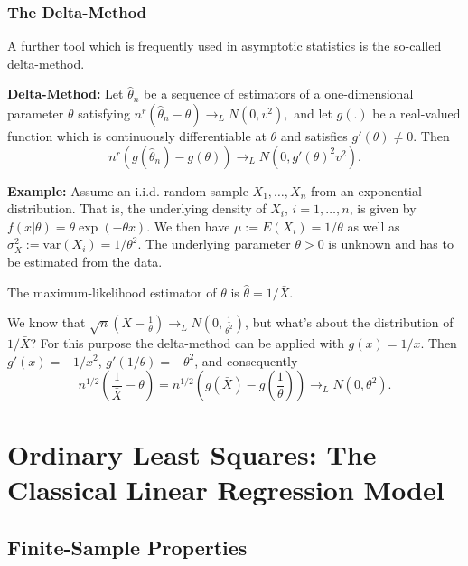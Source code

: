 \documentclass[]{book}
\theoremstyle{definition}
\theoremstyle{definition}
\theoremstyle{definition}
\theoremstyle{remark}
\begin{document}
\hypertarget{the-delta-method}{%
\subsection{The Delta-Method}\label{the-delta-method}}

A further tool which is frequently used in asymptotic statistics is the so-called delta-method.

\textbf{Delta-Method:} Let \(\widehat{\theta}_n\) be a sequence of estimators of a one-dimensional parameter \(\theta\) satisfying
\(n^{r} (\widehat{\theta}_n-\theta)\rightarrow_L N(0,v^2),\) and let \(g(.)\) be a real-valued function which is continuously differentiable at \(\theta\) and satisfies \(g'(\theta)\neq 0\). Then
\[n^{r} \left(g(\widehat{\theta}_n)-g(\theta)\right) \rightarrow_L  N\left(0,g'(\theta)^2v^2\right).\]

\textbf{Example:} Assume an i.i.d. random sample \(X_1,\dots,X_n\) from an exponential distribution. That is, the underlying density of \(X_i\), \(i=1,\dots,n\), is given by \(f(x|\theta)=\theta\exp(-\theta x)\). We then have \(\mu:=E(X_i)=1/\theta\) as well as \(\sigma^2_X:=\textrm{var}(X_i)=1/\theta^2\). The underlying parameter \(\theta>0\) is unknown and has to be estimated from the data.

The maximum-likelihood estimator of \(\theta\) is \(\hat\theta=1/\bar X\).

We know that \(\sqrt{n}(\bar X-\frac{1}{\theta})\to_L N(0,\frac{1}{\theta^2})\), but what's about the distribution of \(1/\bar X\)? For this purpose the delta-method can be applied with \(g(x)=1/x\). Then \(g'(x)=-1/x^2\), \(g'(1/\theta)=-\theta^2\), and consequently
\[n^{1/2} \left(\frac{1}{\bar X}-\theta\right)=n^{1/2}\left(g\left(\bar X\right)-g\left(\frac{1}{\theta}\right)\right)\rightarrow_L N\left(0,\theta^2\right).\]

\hypertarget{ordinary-least-squares-the-classical-linear-regression-model}{%
\chapter{Ordinary Least Squares: The Classical Linear Regression Model}\label{ordinary-least-squares-the-classical-linear-regression-model}}

\hypertarget{finite-sample-properties}{%
\section{Finite-Sample Properties}\label{finite-sample-properties}}
\end{document}
